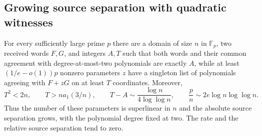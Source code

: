\subsection{Growing source separation with quadratic witnesses}
\label{subsec:growing-gap-random-line}

\begin{theorem}\label{thm:growing-gap-random-line}
For every sufficiently large prime $p$ there are a domain of size $n$ in
$\mathbb F_p$, two received words $F,G$, and integers $A,T$ such that
both words and their common agreement with degree-at-most-two polynomials
are exactly $A$, while at least $(1/e-o(1))p$ nonzero parameters $z$ have
a singleton list of polynomials agreeing with $F+zG$ on at least $T$ coordinates.
Moreover,
\[
 T^2<2n,\qquad T>n a_1(3/n),\qquad
 T-A\sim\frac{\log n}{4\log\log n},\qquad
 \frac pn\sim2e\log n\log\log n.
\]
Thus the number of these parameters is superlinear in $n$ and the absolute
source separation grows, with the polynomial degree fixed at two.
The rate and the relative source separation tend to zero.
\end{theorem}

